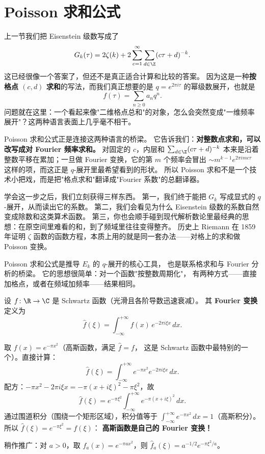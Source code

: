 \section{Poisson 求和公式}
\label{sec:poisson-summation}

上一节我们把 Eisenstein 级数写成了
\[
  G_k(\tau) = 2\zeta(k) + 2\sum_{c=1}^{\infty} \sum_{d\in\Z} (c\tau+d)^{-k}.
\]
这已经很像一个答案了，但还不是真正适合计算和比较的答案。
因为这是一种\textbf{按格点 $(c,d)$ 求和}的写法，而我们真正想要的是 $q=e^{2\pi i\tau}$ 的幂级数展开，也就是
\[
  f(\tau)=\sum_{n\ge 0} a_n q^n.
\]
问题就在这里：一个看起来像"二维格点总和"的对象，怎么会突然变成"一维频率展开"？这两种语言表面上几乎毫不相干。

Poisson 求和公式正是连接这两种语言的桥梁。
它告诉我们：\textbf{对整数点求和，可以改写成对 Fourier 频率求和。}
对固定的 $c$，内层和
$\sum_{d\in\Z}(c\tau+d)^{-k}$
本来是沿着整数平移在累加；一旦做 Fourier 变换，它的第 $m$ 个频率会冒出
$\sim m^{k-1}e^{2\pi i mc\tau}$
这样的项，而这正是 $q$-展开里最希望看到的形状。
所以 Poisson 求和不是一个技术小把戏，而是把"格点求和"翻译成"Fourier 系数"的总翻译器。

学会这一步之后，我们立刻获得三样东西。
第一，我们终于能把 $G_k$ 写成显式的 $q$-展开，从而读出它的系数。
第二，我们会看见为什么 Eisenstein 级数的系数自然变成除数和这类算术函数。
第三，你也会顺手碰到现代解析数论里最经典的思想：在原空间里难看的和，到了频域里往往变得整齐。
历史上 Riemann 在 1859 年证明 $\zeta$ 函数的函数方程，本质上用的就是同一套办法——对格上的求和做 Poisson 变换。

Poisson 求和公式是推导 $E_k$ 的 $q$-展开的核心工具，
也是联系格求和与 Fourier 分析的桥梁。
它的思想很简单：对一个函数"按整数周期化"，
有两种方式——直接加格点，或者在频域加频率——结果相同。

\begin{definition}[Fourier 变换]
\label{def:fourier-transform}
设 $f\colon \R \to \C$ 是 Schwartz 函数（光滑且各阶导数迅速衰减）。
其 \textbf{Fourier 变换}定义为
\[
  \hat{f}(\xi) = \int_{-\infty}^{+\infty} f(x)\, e^{-2\pi i \xi x}\, dx.
\]
\end{definition}

\begin{example}
\label{ex:gaussian-fourier}
取 $f(x) = e^{-\pi x^2}$（高斯函数，满足 $\hat{f} = f$，
这是 Schwartz 函数中最特别的一个）。直接计算：
\[
  \hat{f}(\xi)
  = \int_{-\infty}^{+\infty} e^{-\pi x^2} e^{-2\pi i \xi x}\, dx.
\]
配方：$-\pi x^2 - 2\pi i \xi x = -\pi(x + i\xi)^2 - \pi\xi^2$，故
\[
  \hat{f}(\xi) = e^{-\pi \xi^2} \int_{-\infty}^{+\infty} e^{-\pi(x+i\xi)^2}\, dx.
\]
通过围道积分（围绕一个矩形区域），积分值等于
$\int_{-\infty}^{+\infty} e^{-\pi x^2}\, dx = 1$（高斯积分）。
所以 $\hat{f}(\xi) = e^{-\pi\xi^2} = f(\xi)$：
\textbf{高斯函数是自己的 Fourier 变换！}

稍作推广：对 $a > 0$，取 $f_a(x) = e^{-\pi a x^2}$，则
$\hat{f}_a(\xi) = a^{-1/2} e^{-\pi \xi^2/a}$。
\end{example}

